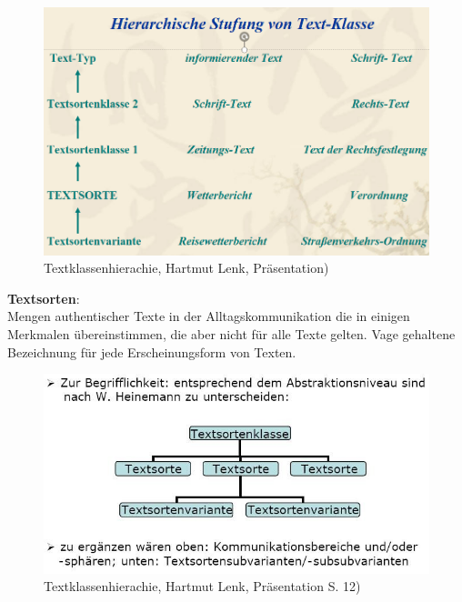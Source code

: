 \documentclass[
  letterpaper,
]{scrbook}
\begin{document}
\begin{figure}

{\centering \includegraphics[width=1\textwidth,height=\textheight]{./pictures/textklassenhierachie.png}

}

\caption{Textklassenhierachie, Hartmut Lenk, Präsentation)}

\end{figure}

\textbf{Textsorten}:\\
Mengen authentischer Texte in der Alltagskommunikation die in einigen
Merkmalen übereinstimmen, die aber nicht für alle Texte gelten. Vage
gehaltene Bezeichnung für jede Erscheinungsform von Texten.

\begin{figure}

{\centering \includegraphics[width=1\textwidth,height=\textheight]{./pictures/textklassenhierachie2.jpg}

}

\caption{Textklassenhierachie, Hartmut Lenk, Präsentation S. 12)}

\end{figure}
\end{document}
